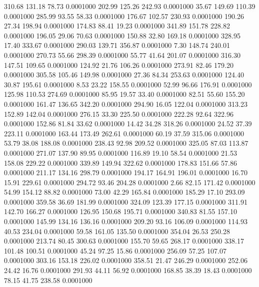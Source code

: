  310.68  131.18   78.73   0.0001000
 202.99  125.26  242.93   0.0001000
  35.67  149.69  110.39   0.0001000
 285.99   93.55   58.33   0.0001000
 176.67  102.57  230.93   0.0001000
 190.26   27.34  198.94   0.0001000
 174.83   88.41   19.23   0.0001000
 341.89  151.78  228.82   0.0001000
 196.05   29.06   70.63   0.0001000
 150.88   32.80  169.18   0.0001000
 328.95   17.40  333.67   0.0001000
 290.03  139.71  356.87   0.0001000
   7.30  148.74  240.01   0.0001000
 270.73   55.66  298.39   0.0001000
  55.77   41.64  201.07   0.0001000
 316.30  147.51  109.65   0.0001000
 124.92   21.76  106.26   0.0001000
 273.91   82.46  179.20   0.0001000
 305.58  105.46  149.98   0.0001000
  27.36   84.34  253.63   0.0001000
 124.40   30.87  195.61   0.0001000
   8.53   23.22  158.55   0.0001000
  52.99   96.66  176.91   0.0001000
 125.98  110.53  274.69   0.0001000
  85.95   19.57   33.40   0.0001000
  82.51   55.60  155.20   0.0001000
 161.47  136.65  342.20   0.0001000
 294.90   16.05  122.04   0.0001000
 313.23  152.89  142.04   0.0001000
 276.15   33.30  225.50   0.0001000
 222.28   92.64  322.96   0.0001000
 152.86   81.84   33.62   0.0001000
  14.42   34.28  318.26   0.0001000
  24.52   37.39  223.11   0.0001000
 163.44  173.49  262.61   0.0001000
  60.19   37.59  315.06   0.0001000
  53.79   38.08  188.08   0.0001000
 238.43   92.98  209.52   0.0001000
 325.05   87.03  113.87   0.0001000
 271.07  137.90   89.95   0.0001000
 116.89   19.10   58.54   0.0001000
  21.53  158.08  229.22   0.0001000
 339.89  149.94  322.62   0.0001000
 178.83  151.66   57.86   0.0001000
 211.17  134.16  298.79   0.0001000
 194.17  164.91  196.01   0.0001000
  16.70   15.91  229.61   0.0001000
 294.72   93.46  204.28   0.0001000
   2.66   82.15  171.42   0.0001000
  54.99  154.12   88.82   0.0001000
  73.00   42.29  165.84   0.0001000
 185.29   17.10  293.09   0.0001000
 359.58   36.69  181.99   0.0001000
 324.09  123.39  177.15   0.0001000
 311.91  142.70  166.27   0.0001000
 126.95  150.68  195.71   0.0001000
 340.83   81.55  157.10   0.0001000
 145.99  134.16  136.16   0.0001000
 209.20   93.16  106.09   0.0001000
 114.93   40.53  234.04   0.0001000
  59.58  161.05  135.50   0.0001000
 354.04   26.53  250.28   0.0001000
 213.74   80.45  300.63   0.0001000
 155.70   59.65  268.17   0.0001000
 338.17  101.48  100.51   0.0001000
  45.24   97.25   15.86   0.0001000
 256.09   57.25  107.07   0.0001000
 303.16  153.18  226.02   0.0001000
 358.51   21.47  246.29   0.0001000
 252.06   24.42   16.76   0.0001000
 291.93   44.11   56.92   0.0001000
 168.85   38.39   18.43   0.0001000
  78.15   41.75  238.58   0.0001000
